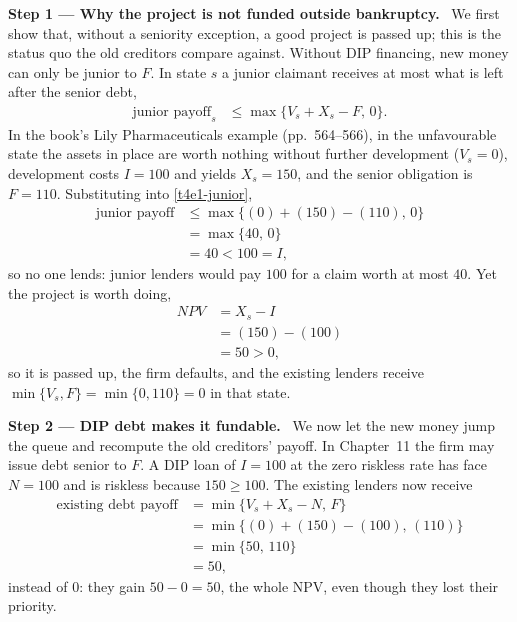 \documentclass[11pt,a4paper]{article}
\newcommand{\step}[2]{\par\medskip\noindent\textbf{Step #1 --- #2.}~}
\begin{document}
\step{1}{Why the project is not funded outside bankruptcy} We first show that, without a
seniority exception, a good project is passed up; this is the status quo the old creditors
compare against. Without DIP financing, new money can only be junior to $F$. In state $s$ a junior claimant receives at most what is left after the
senior debt,
\begin{align}
  \text{junior payoff}_s &\le \max\{V_s+X_s-F,\,0\}. \label{t4e1-junior}
\end{align}
In the book's Lily Pharmaceuticals example (pp.~564--566), in the unfavourable state the
assets in place are worth nothing without further development ($V_s=0$), development costs
$I=100$ and yields $X_s=150$, and the senior obligation is $F=110$. Substituting into
\eqref{t4e1-junior},
\begin{align}
  \text{junior payoff} &\le \max\{(0)+(150)-(110),\,0\} \nonumber\\
                       &= \max\{40,\,0\} \nonumber\\
                       &= 40 < 100 = I, \nonumber
\end{align}
so no one lends: junior lenders would pay $100$ for a claim worth at most $40$. Yet the project
is worth doing,
\begin{align}
  \mathit{NPV} &= X_s-I \nonumber\\
               &= (150)-(100) \nonumber\\
               &= 50>0, \nonumber
\end{align}
so it is passed up, the firm defaults, and the existing lenders receive
$\min\{V_s,F\}=\min\{0,110\}=0$ in that state.

\step{2}{DIP debt makes it fundable} We now let the new money jump the queue and recompute the
old creditors' payoff. In Chapter~11 the firm may issue debt senior to $F$. A DIP
loan of $I=100$ at the zero riskless rate has face $N=100$ and is riskless because
$150\ge 100$. The existing lenders now receive
\begin{align}
  \text{existing debt payoff} &= \min\{V_s+X_s-N,\,F\} \label{t4e1-old}\\
                              &= \min\{(0)+(150)-(100),\,(110)\} \nonumber\\
                              &= \min\{50,\,110\} \nonumber\\
                              &= 50, \nonumber
\end{align}
instead of $0$: they gain $50-0=50$, the whole NPV, even though they lost their priority.
\end{document}
